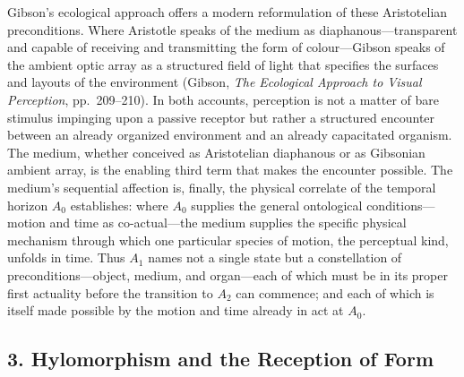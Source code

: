 \documentclass[12pt]{article}
\begin{document}
Gibson's ecological approach offers a modern reformulation of these Aristotelian preconditions. Where Aristotle speaks of the medium as diaphanous---transparent and capable of receiving and transmitting the form of colour---Gibson speaks of the ambient optic array as a structured field of light that specifies the surfaces and layouts of the environment (Gibson, \textit{The Ecological Approach to Visual Perception}, pp.~209--210). In both accounts, perception is not a matter of bare stimulus impinging upon a passive receptor but rather a structured encounter between an already organized environment and an already capacitated organism. The medium, whether conceived as Aristotelian diaphanous or as Gibsonian ambient array, is the enabling third term that makes the encounter possible. The medium's sequential affection is, finally, the physical correlate of the temporal horizon $A_0$ establishes: where $A_0$ supplies the general ontological conditions---motion and time as co-actual---the medium supplies the specific physical mechanism through which one particular species of motion, the perceptual kind, unfolds in time. Thus $A_1$ names not a single state but a constellation of preconditions---object, medium, and organ---each of which must be in its proper first actuality before the transition to $A_2$ can commence; and each of which is itself made possible by the motion and time already in act at $A_0$.

\subsection*{3. Hylomorphism and the Reception of Form}
\end{document}
